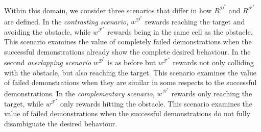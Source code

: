 \documentclass{aamas2016}
\newcommand{\jm}[1]{\textcolor{blue}{Joao: #1}}
\newcommand{\ks}[1]{\textcolor{dark_green}{Kyriacos: #1}}
\newcommand{\jm}[1]{}
\newcommand{\ks}[1]{}
\begin{document}


Within this domain, we consider three scenarios that differ in how $R^{\mathcal{D}^*}$ and $R^{\mathcal{F}^*}$ are defined.  In the \emph{contrasting scenario}, $w^{\mathcal{D}^*}$ rewards reaching the target and avoiding the obstacle, while $w^{\mathcal{F}^*}$ rewards being in the same cell as the obstacle.  This scenario examines the value of completely failed demonstrations when the successful demonstrations already show the complete desired behaviour. In the second \emph{overlapping scenario} $w^{\mathcal{D}^*}$ is as before but $w^{\mathcal{F}^*}$ rewards not only colliding with the obstacle, but also reaching the target. This scenario examines the value of failed demonstrations when they are similar in some respects to the successful demonstrations. In the \emph{complementary scenario}, $w^{\mathcal{D}^*}$ rewards only reaching the target, while $w^{\mathcal{F}^*}$ only rewards hitting the obstacle. This scenario examines the value of failed demonstrations when the successful demonstrations do not fully disambiguate the desired behaviour.
\end{document}
